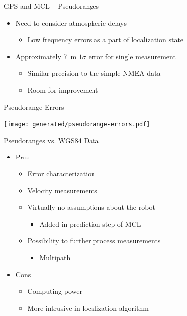 \documentclass[utf8,12pt]{beamer}
\begin{document}
\begin{frame}{GPS and MCL -- Pseudoranges}
    \begin{itemize}
        \item Need to consider atmospheric delays
        \begin{itemize}
            \item Low frequency errors as a part of localization state
        \end{itemize}
        \item Approximately \SI{7}{\meter} \(1\sigma\) error for single measurement
        \begin{itemize}
            \item Similar precision to the simple NMEA data
            \item Room for improvement
        \end{itemize}
    \end{itemize}
\end{frame}

\begin{frame}[plain]{Pseudorange Errors}
\begin{center}
\centerline{\texttt{[image: generated/pseudorange-errors.pdf]}}
\end{center}
\end{frame}

\begin{frame}{Pseudoranges vs. WGS84 Data}
    \begin{itemize}
        \item Pros
        \begin{itemize}
            \item Error characterization
            \item Velocity measurements
            \item Virtually no assumptions about the robot
            \begin{itemize}
                \item Added in prediction step of MCL
            \end{itemize}
            \item Possibility to further process measurements
            \begin{itemize}
                \item Multipath
            \end{itemize}
        \end{itemize}
        \item Cons
        \begin{itemize}
            \item Computing power
            \item More intrusive in localization algorithm
        \end{itemize}
    \end{itemize}
\end{frame}
\end{document}
